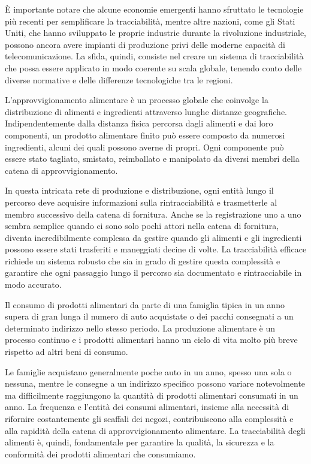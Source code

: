È importante notare che alcune economie emergenti hanno sfruttato le tecnologie più recenti per semplificare la tracciabilità, mentre altre nazioni, come gli Stati Uniti, che hanno sviluppato le proprie industrie durante la rivoluzione industriale, possono ancora avere impianti di produzione privi delle moderne capacità di telecomunicazione. La sfida, quindi, consiste nel creare un sistema di tracciabilità che possa essere applicato in modo coerente su scala globale, tenendo conto delle diverse normative e delle differenze tecnologiche tra le regioni.

L'approvvigionamento alimentare è un processo globale che coinvolge la distribuzione di alimenti e ingredienti attraverso lunghe distanze geografiche. Indipendentemente dalla distanza fisica percorsa dagli alimenti e dai loro componenti, un prodotto alimentare finito può essere composto da numerosi ingredienti, alcuni dei quali possono averne di propri. Ogni componente può essere stato tagliato, smistato, reimballato e manipolato da diversi membri della catena di approvvigionamento.

In questa intricata rete di produzione e distribuzione, ogni entità lungo il percorso deve acquisire informazioni sulla rintracciabilità e trasmetterle al membro successivo della catena di fornitura. Anche se la registrazione uno a uno sembra semplice quando ci sono solo pochi attori nella catena di fornitura, diventa incredibilmente complessa da gestire quando gli alimenti e gli ingredienti possono essere stati trasferiti e maneggiati decine di volte. La tracciabilità efficace richiede un sistema robusto che sia in grado di gestire questa complessità e garantire che ogni passaggio lungo il percorso sia documentato e rintracciabile in modo accurato.

Il consumo di prodotti alimentari da parte di una famiglia tipica in un anno supera di gran lunga il numero di auto acquistate o dei pacchi consegnati a un determinato indirizzo nello stesso periodo. La produzione alimentare è un processo continuo e i prodotti alimentari hanno un ciclo di vita molto più breve rispetto ad altri beni di consumo.

Le famiglie acquistano generalmente poche auto in un anno, spesso una sola o nessuna, mentre le consegne a un indirizzo specifico possono variare notevolmente ma difficilmente raggiungono la quantità di prodotti alimentari consumati in un anno. La frequenza e l'entità dei consumi alimentari, insieme alla necessità di rifornire costantemente gli scaffali dei negozi, contribuiscono alla complessità e alla rapidità della catena di approvvigionamento alimentare. La tracciabilità degli alimenti è, quindi, fondamentale per garantire la qualità, la sicurezza e la conformità dei prodotti alimentari che consumiamo.

